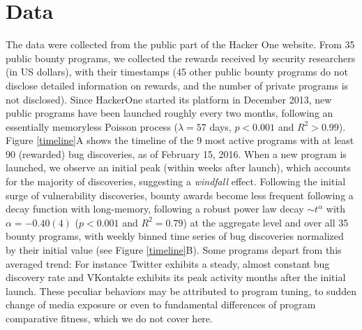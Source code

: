 \section{Data}
\label{sec:data}
The data were collected from the public part of the Hacker One website. From 35 public bounty programs, we collected the rewards received by security researchers (in US dollars), with their timestamps (45 other public bounty programs do not disclose detailed information on rewards, and the number of private programs is not disclosed). Since HackerOne started its platform in December 2013, new public programs have been launched roughly every two months, following an essentially memoryless Poisson process ($\lambda = 57$ days, $p < 0.001$ and $R^2 > 0.99$). Figure \ref{timeline}A shows the timeline of the 9 most active programs with at least 90 (rewarded) bug discoveries, as of February 15, 2016. When a new program is launched, we observe an initial peak (within weeks after launch), which accounts for the majority of discoveries, suggesting a {\it windfall} effect. Following the initial surge of vulnerability discoveries, bounty awards become less frequent following a decay function with long-memory, following a robust power law decay $\sim t^{\alpha}$ with $\alpha = -0.40(4)$ ($p < 0.001$ and $R^2 = 0.79$) at the aggregate level and over all 35 bounty programs, with weekly binned time series of bug discoveries normalized by their initial value (see Figure \ref{timeline}B). Some programs depart from this averaged trend: For instance Twitter exhibits a steady, almost constant bug discovery rate and VKontakte exhibits its peak activity months after the initial launch. These peculiar behaviors may be attributed to program tuning, to sudden change of media exposure or even to fundamental differences of program comparative fitness, which we do not cover here.\\

